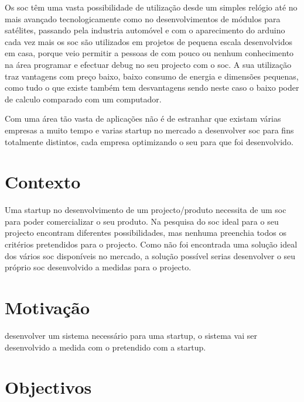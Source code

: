 Os \acrshort{soc} têm uma vasta possibilidade de utilização desde um simples relógio até no mais avançado tecnologicamente como no desenvolvimentos de módulos para satélites, passando pela industria automóvel e com o aparecimento do arduino cada vez mais os \acrshort{soc} são utilizados em projetos de pequena escala desenvolvidos em casa, porque veio permitir a pessoas de com pouco ou nenhum conhecimento na área programar e efectuar debug no seu projecto com o \acrshort{soc}. A sua utilização traz vantagens com preço baixo, baixo consumo de energia e dimensões pequenas, como tudo o que existe também tem desvantagens sendo neste caso o baixo poder de calculo comparado com um computador. %

Com uma área tão vasta de aplicações não é de estranhar que existam várias empresas \textcolor[rgb]{1,0,0}{a muito tempo} e varias startup no mercado a desenvolver \acrshort{soc} para fins totalmente distintos, cada empresa optimizando o seu para que foi desenvolvido.



\section{Contexto}
\label{section:context}

Uma startup no desenvolvimento de um projecto/produto necessita de um \acrshort{soc} para poder comercializar o seu produto. Na pesquisa do \acrshort{soc} ideal para o seu projecto encontram diferentes possibilidades, mas nenhuma preenchia todos os critérios pretendidos para o projecto. Como não foi encontrada uma solução ideal dos vários \acrshort{soc} disponíveis no mercado, a solução possível serias desenvolver o seu próprio \acrshort{soc} desenvolvido a medidas para o projecto.

\section{Motiva\c{c}\~ao}
\label{section:motiva}

\textcolor[rgb]{0,0,1}{desenvolver um sistema necessário para uma startup, o sistema vai ser desenvolvido a medida com o pretendido com a startup.}

\section{Objectivos}
\label{section:objectivo}

